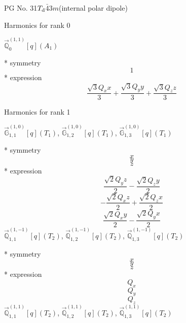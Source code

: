 \documentclass[fleqn,8pt]{jsarticle}
\begin{document}
\setcounter{MaxMatrixCols}{32}

\renewcommand{\tablename}{Table~}
\renewcommand{\figurename}{Figure~}
\begin{center}
\LARGE
PG No. 31\quad$T_{\rm d}$\quad$\bar{4}3m$\quad[ cubic ] (internal polar dipole)
\end{center}

\noindent * Harmonics for rank 0

\noindent\quad $\vec{\mathbb{Q}}_{0}^{(1,1)}[q](A_{1})$

\noindent\quad ** symmetry
\begin{dmath*}
1
\end{dmath*}
\noindent\quad ** expression
\begin{dmath*}
\frac{\sqrt{3} Q_{x} x}{3} + \frac{\sqrt{3} Q_{y} y}{3} + \frac{\sqrt{3} Q_{z} z}{3}
\end{dmath*}

\noindent * Harmonics for rank 1

\noindent\quad $\vec{\mathbb{G}}_{1,1}^{(1,0)}[q](T_{1})$, $\vec{\mathbb{G}}_{1,2}^{(1,0)}[q](T_{1})$, $\vec{\mathbb{G}}_{1,3}^{(1,0)}[q](T_{1})$

\noindent\quad ** symmetry
\begin{dmath*}
x
\end{dmath*}
\begin{dmath*}
y
\end{dmath*}
\begin{dmath*}
z
\end{dmath*}
\noindent\quad ** expression
\begin{dmath*}
\frac{\sqrt{2} Q_{y} z}{2} - \frac{\sqrt{2} Q_{z} y}{2}
\end{dmath*}
\begin{dmath*}
- \frac{\sqrt{2} Q_{x} z}{2} + \frac{\sqrt{2} Q_{z} x}{2}
\end{dmath*}
\begin{dmath*}
\frac{\sqrt{2} Q_{x} y}{2} - \frac{\sqrt{2} Q_{y} x}{2}
\end{dmath*}
\noindent\quad $\vec{\mathbb{Q}}_{1,1}^{(1,-1)}[q](T_{2})$, $\vec{\mathbb{Q}}_{1,2}^{(1,-1)}[q](T_{2})$, $\vec{\mathbb{Q}}_{1,3}^{(1,-1)}[q](T_{2})$

\noindent\quad ** symmetry
\begin{dmath*}
x
\end{dmath*}
\begin{dmath*}
y
\end{dmath*}
\begin{dmath*}
z
\end{dmath*}
\noindent\quad ** expression
\begin{dmath*}
Q_{x}
\end{dmath*}
\begin{dmath*}
Q_{y}
\end{dmath*}
\begin{dmath*}
Q_{z}
\end{dmath*}
\noindent\quad $\vec{\mathbb{Q}}_{1,1}^{(1,1)}[q](T_{2})$, $\vec{\mathbb{Q}}_{1,2}^{(1,1)}[q](T_{2})$, $\vec{\mathbb{Q}}_{1,3}^{(1,1)}[q](T_{2})$
\end{document}

